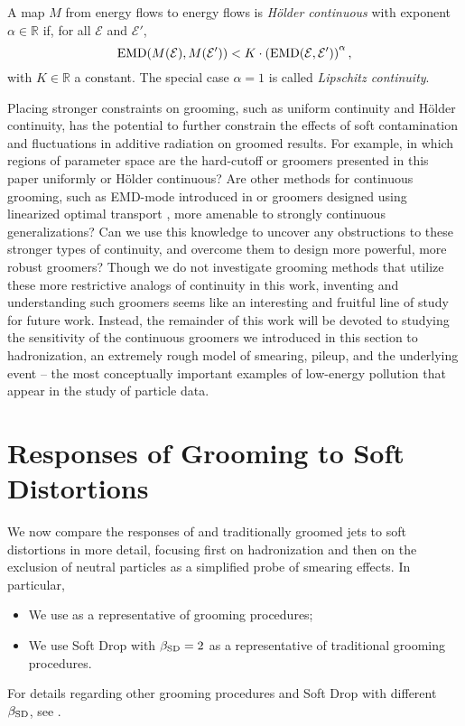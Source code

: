 \documentclass[letterpaper,11pt]{article}
\begin{document}
\begin{definition}\label{def:eventholdercontinuity}
A map \(M\) from energy flows to energy flows is \textit{H\"older continuous} with exponent \(\alpha \in \mathbb R\) if, for all \(\mathcal{E}\) and \(\mathcal E'\),
%
\begin{equation*}\label{eqn:emdholdercontinuity}
    {\rm EMD}(M(\mathcal E), M(\mathcal E'))
    <
    K \cdot \left({\rm EMD}(\mathcal E, \mathcal E')\right)^\alpha,
\end{equation*}
with \(K\in \mathbb R\) a constant.
%
The special case \(\alpha = 1\) is called \textit{Lipschitz continuity}.
\end{definition}

Placing stronger constraints on grooming, such as uniform continuity and H\"older continuity, has the potential to further constrain the effects of soft contamination and fluctuations in additive radiation on groomed results.
%
For example, in which regions of parameter space are the hard-cutoff or \PIRANHA{} groomers presented in this paper uniformly or H\"older continuous?
%
Are other methods for continuous grooming, such as EMD-mode \PIRANHA{} introduced in  or \PIRANHA{} groomers designed using linearized optimal transport \cite{Cai:2020vzx,Cai:2021hnn,cai2022linearized,sarrazin2023linearized}, more amenable to strongly continuous generalizations?
%
Can we use this knowledge to uncover any obstructions to these stronger types of continuity, and overcome them to design more powerful, more robust groomers?
%
Though we do not investigate grooming methods that utilize these more restrictive analogs of continuity in this work, inventing and understanding such groomers seems like an interesting and fruitful line of study for future work.
%
Instead, the remainder of this work will be devoted to studying the sensitivity of the continuous groomers we introduced in this section to hadronization, an extremely rough model of smearing, pileup, and the underlying event -- the most conceptually important examples of low-energy pollution that appear in the study of particle data.


\section{Responses of Grooming to Soft Distortions}
\label{sec:soft_distortion}

We now compare the responses of \PIRANHA{} and traditionally groomed jets to soft distortions in more detail, focusing first on hadronization and then on the exclusion of neutral particles as a simplified probe of smearing effects.
%
In particular,
\begin{itemize}
    \item We use  as a representative of \PIRANHA{} grooming procedures;
    \item We use Soft Drop with \(\beta_{\rm SD} = 2\) as a representative of traditional grooming procedures.
\end{itemize}
%
For details regarding other \PIRANHA{} grooming procedures and Soft Drop with different \(\beta_{\rm SD}\), see .
\end{document}
